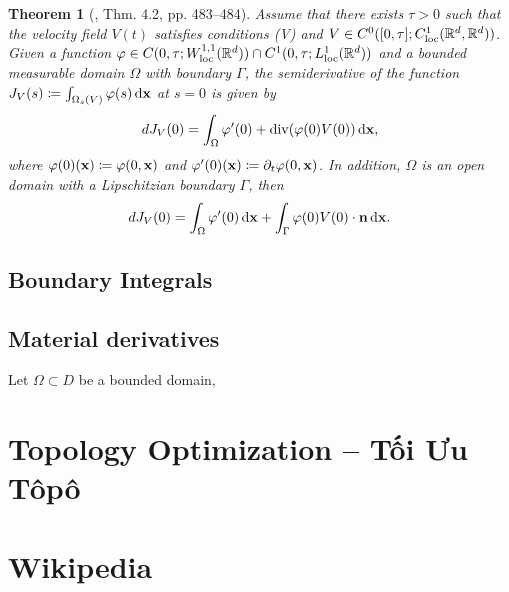\documentclass{article}
\newtheorem{theorem}{Theorem}
\begin{document}
\begin{itemize}
	\begin{theorem}[\cite{Delfour_Zolesio2011}, Thm. 4.2, pp. 483--484]
		Assume that there exists $\tau > 0$ such that the velocity field $V(t)$ satisfies conditions (V) and $V\in C^0([0,\tau];C_{\rm loc}^1(\mathbb{R}^d,\mathbb{R}^d))$. Given a function $\varphi\in C(0,\tau;W_{\rm loc}^{1,1}(\mathbb{R}^d))\cap C^1(0,\tau;L_{\rm loc}^1(\mathbb{R}^d))$ and a bounded measurable domain $\Omega$ with boundary $\Gamma$, the semiderivative of the function $J_V(s)\coloneqq\int_{\Omega_s(V)} \varphi(s)\,{\rm d}{\bf x}$ at $s = 0$ is given by
		\begin{equation}
			dJ_V(0) = \int_\Omega \varphi'(0) + \operatorname{div}(\varphi(0)V(0))\,{\rm d}{\bf x},
		\end{equation}
		where $\varphi(0)({\bf x})\coloneqq\varphi(0,{\bf x})$ and $\varphi'(0)({\bf x})\coloneqq\partial_t\varphi(0,{\bf x})$. In addition, $\Omega$ is an open domain with a Lipschitzian boundary $\Gamma$, then
		\begin{equation}
			dJ_V(0) = \int_\Omega \varphi'(0)\,{\rm d}{\bf x} + \int_\Gamma \varphi(0)V(0)\cdot{\bf n}\,{\rm d}{\bf x}.
		\end{equation}
	\end{theorem}
	
\end{itemize}

\subsection{Boundary Integrals}

\subsection{Material derivatives}
Let $\Omega\subset D$ be a bounded domain, 


\section{Topology Optimization -- Tối Ưu Tôpô}


\section{Wikipedia}
\end{document}
